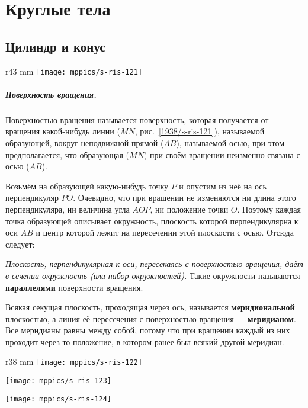 \chapter{Круглые тела}


\section{Цилиндр и конус}

\begin{wrapfigure}{r}{43 mm}
\vskip-0mm
\centering
\texttt{[image: mppics/s-ris-121]}
\caption{}\label{1938/s-ris-121}
\vskip-0mm
\end{wrapfigure}

\paragraph{Поверхность вращения.}\label{1938/s105}
Поверхностью вращения называется поверхность, которая получается от вращения какой-нибудь линии ($MN$, рис.~\ref{1938/s-ris-121}), называемой образующей, вокруг неподвижной прямой ($AB$), называемой осью, при этом предполагается, что образующая ($MN$) при своём вращении неизменно связана с осью ($AB$).

Возьмём на образующей какую-нибудь точку $P$ и опустим из неё на ось перпендикуляр $PO$.
Очевидно, что при вращении не изменяются ни длина этого перпендикуляра, ни величина угла $AOP$, ни положение точки $O$.
Поэтому каждая точка образующей описывает окружность, плоскость которой перпендикулярна к оси $AB$ и центр которой лежит на пересечении этой плоскости с осью.
Отсюда следует:

\emph{Плоскость, перпендикулярная к оси, пересекаясь с поверхностью вращения, даёт в сечении окружность (или набор окружностей).} 
Такие окружности называются  \textbf{параллелями} поверхности вращения.

Всякая секущая плоскость, проходящая через ось, называется \textbf{меридиональной} плоскостью, а линия её пересечения с поверхностью вращения — \textbf{меридианом}.
Все меридианы равны между собой, потому что при вращении каждый из них проходит через то положение, в котором ранее был всякий другой меридиан.


\begin{wrapfigure}{r}{38 mm}
\vskip-0mm
\centering
\texttt{[image: mppics/s-ris-122]}
\caption{}\label{1938/s-ris-122}
\bigskip
\texttt{[image: mppics/s-ris-123]}
\caption{}\label{1938/s-ris-123}
\bigskip
\texttt{[image: mppics/s-ris-124]}
\caption{}\label{1938/s-ris-124}
\vskip-0mm
\end{wrapfigure}

